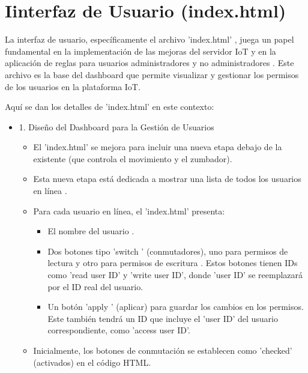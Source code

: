 \documentclass{report}
\begin{document}
\section{Iinterfaz de Usuario (index.html)}
La interfaz de usuario, específicamente el archivo  'index.html' , juega un papel fundamental en la implementación de las  mejoras del servidor IoT  
y en la aplicación de  reglas para usuarios administradores y no administradores . Este archivo es la base del  dashboard  que permite visualizar 
y gestionar los permisos de los usuarios en la plataforma IoT.

Aquí se dan los detalles de 'index.html' en este contexto:
\begin{itemize}
    \item 1. Diseño del Dashboard para la Gestión de Usuarios
    \begin{itemize}
        \item El 'index.html' se mejora para incluir una  nueva etapa debajo de la existente  (que controla el movimiento y el zumbador).
        \item Esta nueva etapa está dedicada a mostrar una  lista de todos los usuarios en línea .
        \item Para cada usuario en línea, el 'index.html' presenta:
        \begin{itemize}
            \item El  nombre del usuario .
            \item Dos botones tipo  'switch '  (conmutadores), uno para  permisos de lectura  y otro para  permisos de escritura . Estos botones tienen 
            IDs como 'read user ID' y 'write user ID', donde 'user ID' se reemplazará por el ID real del usuario.
            \item Un  botón  'apply '  (aplicar) para guardar los cambios en los permisos. Este también tendrá un ID que incluye el 'user ID' del 
            usuario correspondiente, como 'access user ID'.
        \end{itemize}
        \item Inicialmente, los botones de conmutación se establecen como 'checked' (activados) en el código HTML.
    \end{itemize}


\end{itemize}
\end{document}

